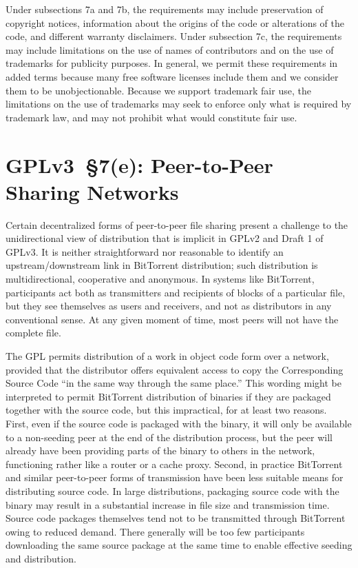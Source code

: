 
Under subsections 7a and 7b, the requirements may include preservation of
copyright notices, information about the origins of the code or alterations
of the code, and different warranty disclaimers. Under subsection 7c, the
requirements may include limitations on the use of names of contributors and
on the use of trademarks for publicity purposes. In general, we permit these
requirements in added terms because many free software licenses include them
and we consider them to be unobjectionable. Because we support trademark fair
use, the limitations on the use of trademarks may seek to enforce only what
is required by trademark law, and may not prohibit what would constitute fair
use.


\section{GPLv3~\S7(e): Peer-to-Peer Sharing Networks}


Certain decentralized forms of peer-to-peer file sharing present a challenge
to the unidirectional view of distribution that is implicit in GPLv2 and
Draft 1 of GPLv3.  It is neither straightforward nor reasonable to identify
an upstream/downstream link in BitTorrent distribution; such distribution is
multidirectional, cooperative and anonymous.  In systems like BitTorrent,
participants act both as transmitters and recipients of blocks of a
particular file, but they see themselves as users and receivers, and not as
distributors in any conventional sense.  At any given moment of time, most
peers will not have the complete file.


The GPL permits distribution of a work in object code form over a network,
provided that the distributor offers equivalent access to copy the
Corresponding Source Code ``in the same way through the same place.''  This
wording might be interpreted to permit BitTorrent distribution of binaries if
they are packaged together with the source code, but this impractical, for at
least two reasons. First, even if the source code is packaged with the
binary, it will only be available to a non-seeding peer at the end of the
distribution process, but the peer will already have been providing parts of
the binary to others in the network, functioning rather like a router or a
cache proxy.  Second, in practice BitTorrent and similar peer-to-peer forms
of transmission have been less suitable means for distributing source code.
In large distributions, packaging source code with the binary may result in a
substantial increase in file size and transmission time.  Source code
packages themselves tend not to be transmitted through BitTorrent owing to
reduced demand. There generally will be too few participants downloading the
same source package at the same time to enable effective seeding and
distribution.

